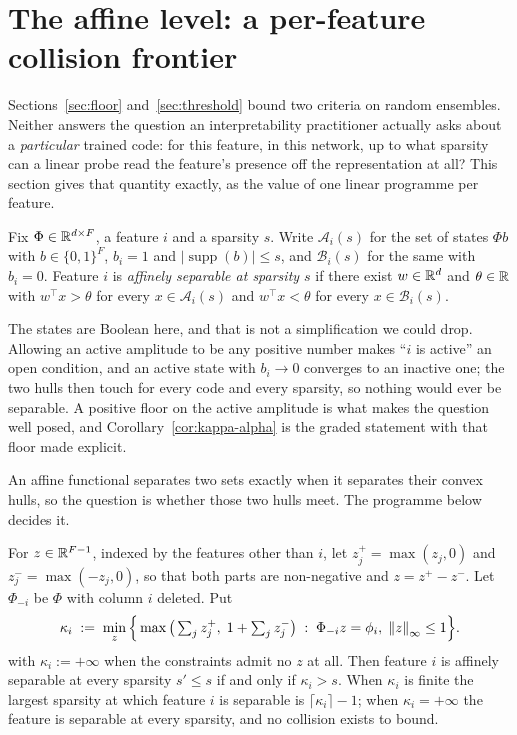 \section{The affine level: a per-feature collision frontier}
\label{sec:frontier}

Sections~\ref{sec:floor} and~\ref{sec:threshold} bound two criteria on random ensembles. Neither
answers the question an interpretability practitioner actually asks about a \emph{particular}
trained code: for this feature, in this network, up to what sparsity can a linear probe read the
feature's presence off the representation at all? This section gives that quantity exactly, as
the value of one linear programme per feature.

\begin{definition}
\label{def:affsep}
Fix $\Phi\in\mathbb{R}^{d\times F}$, a feature $i$ and a sparsity $s$. Write $\mathcal A_i(s)$ for the
set of states $\Phi b$ with $b\in\{0,1\}^F$, $b_i=1$ and $|\operatorname{supp}(b)|\le s$, and
$\mathcal B_i(s)$ for the same with $b_i=0$. Feature $i$ is \emph{affinely separable at sparsity
$s$} if there exist $w\in\mathbb{R}^d$ and $\theta\in\mathbb{R}$ with $w^{\top}x>\theta$ for every
$x\in\mathcal A_i(s)$ and $w^{\top}x<\theta$ for every $x\in\mathcal B_i(s)$.
\end{definition}

The states are Boolean here, and that is not a simplification we could drop. Allowing an active
amplitude to be any positive number makes ``$i$ is active'' an open condition, and an active
state with $b_i\to0$ converges to an inactive one; the two hulls then touch for every code and
every sparsity, so nothing would ever be separable. A positive floor on the active amplitude is
what makes the question well posed, and Corollary~\ref{cor:kappa-alpha} is the graded statement
with that floor made explicit.

An affine functional separates two sets exactly when it separates their convex hulls, so the
question is whether those two hulls meet. The programme below decides it.

\begin{theorem}
\label{thm:frontier}
For $z\in\mathbb{R}^{F-1}$, indexed by the features other than $i$, let $z^{+}_j=\max(z_j,0)$ and
$z^{-}_j=\max(-z_j,0)$, so that both parts are non-negative and $z=z^{+}-z^{-}$. Let
$\Phi_{-i}$ be $\Phi$ with column $i$ deleted. Put
\begin{equation}
  \kappa_i\;:=\;\min_{z}\Big\{\max\big(\textstyle\sum_j z^{+}_j,\;1+\sum_j z^{-}_j\big)
  \;:\;\Phi_{-i}z=\phi_i,\;\left\lVert z \right\rVert_\infty\le1\Big\}.
  \label{eq:kappa}
\end{equation}
with $\kappa_i:=+\infty$ when the constraints admit no $z$ at all. Then feature $i$ is affinely
separable at every sparsity $s'\le s$ if and only if $\kappa_i>s$. When $\kappa_i$ is finite the
largest sparsity at which feature $i$ is separable is $\lceil\kappa_i\rceil-1$; when
$\kappa_i=+\infty$ the feature is separable at every sparsity, and no collision exists to bound.
\end{theorem}

